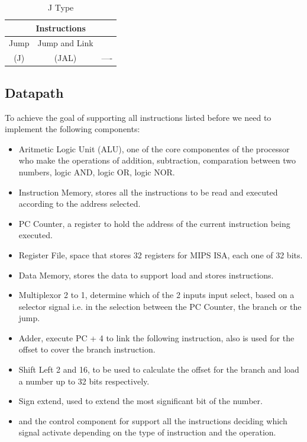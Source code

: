 \documentclass[conference]{IEEEtran}
\begin{document}
\begin{table}[htbp]
\caption{J Type} %
\begin{center}
\begin{tabular}{|c|c|c|}
\hline
\multicolumn{3}{|c|}{\textbf{Instructions}} \\
\hline
Jump&Jump and Link&\\
(J) &(JAL)&----\\
\hline
\end{tabular}
\label{tab_itype}
\end{center}
\end{table}
\subsection{Datapath}
To achieve the goal of supporting all instructions listed before we need to implement the following components:

\begin{itemize}
\item Aritmetic Logic Unit (ALU), one of the core componentes of the processor who make the operations of addition, subtraction, comparation between two numbers, logic AND, logic OR, logic NOR.
\item Instruction Memory, stores all the instructions to be read and executed according to the address selected.
\item PC Counter, a register to hold the address of the current instruction being executed.
\item Register File, space that stores 32 registers for MIPS ISA, each one of 32 bits.
\item Data Memory, stores the data to support load and stores instructions.
\item Multiplexor 2 to 1, determine which of the 2 inputs input select, based on a selector signal i.e. in the selection between the PC Counter, the branch or the jump.
\item Adder, execute PC + 4 to link the following instruction, also is used for the offset to cover the branch instruction.
\item Shift Left 2 and 16, to be used to calculate the offset for the branch and load a number 
up to 32 bits respectively.
\item Sign extend, used to extend the most significant bit of the number.
\item and the control component for support all the instructions deciding which signal activate 
depending on the type of instruction and the operation.
\end{itemize}
\end{document}
